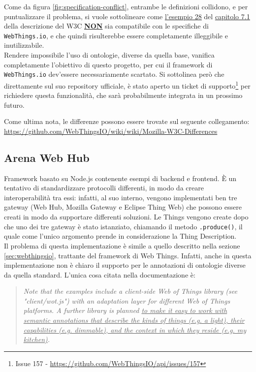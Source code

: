 \documentclass[12pt,a4paper,openright,oneside]{report}
\begin{document}
Come da figura \ref{fig:specification-conflict}, entrambe le definizioni collidono, e per puntualizzare il problema, si vuole sottolineare come \href{https://www.w3.org/TR/wot-thing-description/#example-28}{\ul{l'esempio 28}} del \href{https://www.w3.org/TR/wot-thing-description/#semantic-annotations}{\ul{capitolo 7.1}} della descrizione del W3C \textbf{\uline{NON}} sia compatibile con le specifiche di \texttt{WebThings.io}, e che quindi risulterebbe essere completamente illeggibile e inutilizzabile.\\

Rendere impossibile l'uso di ontologie, diverse da quella base, vanifica completamente l'obiettivo di questo progetto, per cui il framework di \texttt{WebThings.io} dev'essere necessariamente scartato. Si sottolinea però che direttamente sul suo repository ufficiale, è stato aperto un ticket di supporto\footnote{Issue 157 - \url{https://github.com/WebThingsIO/api/issues/157}} per richiedere questa funzionalità, che sarà probabilmente integrata in un prossimo futuro.

Come ultima nota, le differenze possono essere trovate sul seguente collegamento: \url{https://github.com/WebThingsIO/wiki/wiki/Mozilla-W3C-Differences}


\subsection{Arena Web Hub}
Framework \cite{arenawh} basato su Node.js contenente esempi di backend e frontend. È un tentativo di standardizzare protocolli differenti, in modo da creare interoperabilità tra essi: infatti, al suo interno, vengono implementati ben tre gateway (Web Hub, Mozilla Gateway e Eclipse Thing Web) che possono essere creati in modo da supportare differenti soluzioni. Le Things vengono create dopo che uno dei tre gateway è stato istanziato, chiamando il metodo \texttt{.produce()}, il quale come l'unico argomento prende in considerazione la Thing Description.\\

Il problema di questa implementazione è simile a quello descritto nella sezione \ref{sec:webthingsio}, trattante del framework di Web Things. Infatti, anche in questa implementazione non è chiaro il supporto per le annotazioni di ontologie diverse da quella standard. L'unica cosa citata nella documentazione è:

\begin{quote}
\textit{Note that the examples include a client-side Web of Things library (see "client/wot.js") with an adaptation layer for different Web of Things platforms. A further library is planned \ul{to make it easy to work with semantic annotations that describe the kinds of things (e.g. a light), their capabilities (e.g. dimmable), and the context in which they reside (e.g. my kitchen)}.}
\end{quote}
\end{document}
